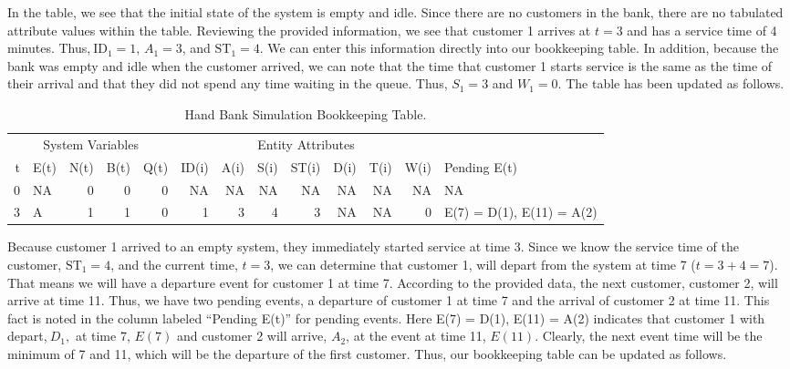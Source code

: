 \documentclass[
]{book}
\theoremstyle{definition}
\theoremstyle{definition}
\theoremstyle{definition}
\theoremstyle{definition}
\theoremstyle{remark}
\begin{document}
In the table, we see that the initial state of the system is empty and
idle. Since there are no customers in the bank, there are no tabulated
attribute values within the table. Reviewing the provided information,
we see that customer 1 arrives at \(t = 3\) and has a service time of 4
minutes. Thus,\(\ \text{ID}_{1} = 1\), \(A_{1} = 3\), and
\(\text{ST}_{1} = 4\). We can enter this information directly into our
bookkeeping table. In addition, because the bank was empty and idle when
the customer arrived, we can note that the time that customer 1 starts
service is the same as the time of their arrival and that they did not
spend any time waiting in the queue. Thus, \(S_{1} = 3\) and \(W_{1} = 0\).
The table has been updated as follows.

\begin{table}

\caption{\label{tab:SQBH2}Hand Bank Simulation Bookkeeping Table.}
\centering
\fontsize{10}{12}\selectfont
\begin{tabular}[t]{rlrrrrrrrrrrl}
\toprule
\multicolumn{5}{c}{System Variables} & \multicolumn{7}{c}{Entity Attributes} & \multicolumn{1}{c}{ } \\
\cmidrule(l{3pt}r{3pt}){1-5} \cmidrule(l{3pt}r{3pt}){6-12}
t & E(t) & N(t) & B(t) & Q(t) & ID(i) & A(i) & S(i) & ST(i) & D(i) & T(i) & W(i) & Pending E(t)\\
\midrule
0 & NA & 0 & 0 & 0 & NA & NA & NA & NA & NA & NA & NA & NA\\
3 & A & 1 & 1 & 0 & 1 & 3 & 4 & 3 & NA & NA & 0 & E(7) = D(1), E(11) = A(2)\\
\bottomrule
\end{tabular}
\end{table}

Because customer 1 arrived to an empty system, they immediately started
service at time 3. Since we know the service time of the customer,
\(\text{ST}_{1} = 4\), and the current time, \(t = 3\), we can determine
that customer 1, will depart from the system at time 7
(\(t = 3 + 4 = 7\)). That means we will have a departure event for
customer 1 at time 7. According to the provided data, the next customer,
customer 2, will arrive at time 11. Thus, we have two pending events, a
departure of customer 1 at time 7 and the arrival of customer 2 at time
11. This fact is noted in the column labeled ``Pending E(t)'' for pending events. Here
E(7) = D(1), E(11) = A(2) indicates that customer 1 with
depart,\(\ D_{1},\) at time 7, \(E\left( 7 \right)\) and customer 2 will
arrive, \(A_{2}\), at the event at time 11, \(E(11)\). Clearly, the next
event time will be the minimum of 7 and 11, which will be the departure
of the first customer. Thus, our bookkeeping table can be updated as
follows.
\end{document}

